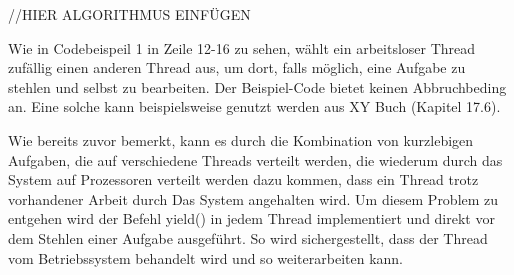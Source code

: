 //HIER ALGORITHMUS EINFÜGEN

Wie in Codebeispeil 1 in Zeile 12-16 zu sehen, wählt ein arbeitsloser Thread zufällig einen anderen Thread aus, um dort, falls möglich, eine Aufgabe zu stehlen und selbst zu bearbeiten. Der Beispiel-Code bietet keinen Abbruchbeding an. Eine solche kann beispielsweise genutzt werden aus XY Buch (Kapitel 17.6).

Wie bereits zuvor bemerkt, kann es durch die Kombination von kurzlebigen Aufgaben, die auf verschiedene Threads verteilt werden, die wiederum durch das System auf Prozessoren verteilt werden dazu kommen, dass ein Thread trotz vorhandener Arbeit durch Das System angehalten wird. Um diesem Problem zu entgehen wird der Befehl yield() in jedem Thread implementiert und direkt vor dem Stehlen einer Aufgabe ausgeführt. So wird sichergestellt, dass der Thread vom Betriebssystem behandelt wird und so weiterarbeiten kann.



